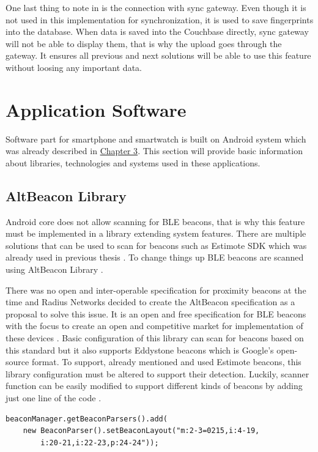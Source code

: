 One last thing to note in  is the connection with sync gateway. Even though it is not used in this implementation for synchronization, it is used to save fingerprints into the database. When data is saved into the Couchbase directly, sync gateway will not be able to display them, that is why the upload goes through the gateway. It ensures all previous and next solutions will be able to use this feature without loosing any important data.

\section{Application Software}\label{sec:ApplicationSoftware}
Software part for smartphone and smartwatch is built on Android system which was already described in \hyperref[sec:WearOS]{Chapter 3}. This section will provide basic information about libraries, technologies and systems used in these applications.

\subsection{AltBeacon Library}\label{subsec:AltBeaconLibrary}
Android core does not allow scanning for BLE beacons, that is why this feature must be implemented in a library extending system features. There are multiple solutions that can be used to scan for beacons such as Estimote SDK \cite{ESDKfA} which was already used in previous thesis \cite{PMRIL}. To change things up BLE beacons are scanned using AltBeacon Library \cite{ABL}.

There was no open and inter-operable specification for proximity beacons at the time and Radius Networks decided to create the AltBeacon specification as a proposal to solve this issue. It is an open and free specification for BLE beacons with the focus to create an open and competitive market for implementation of these devices \cite{AltB}. Basic configuration of this library can scan for beacons based on this standard but it also supports Eddystone beacons which is Google's open-source format. To support, already mentioned and used Estimote beacons, this library configuration must be altered to support their detection. Luckily, scanner function can be easily modified to support different kinds of beacons by adding just one line of the code \cite{ABL, EDDF}.

\begin{lstlisting}[caption=Code to enable all beacon types]
beaconManager.getBeaconParsers().add(
	new BeaconParser().setBeaconLayout("m:2-3=0215,i:4-19,
		i:20-21,i:22-23,p:24-24"));
\end{lstlisting}

